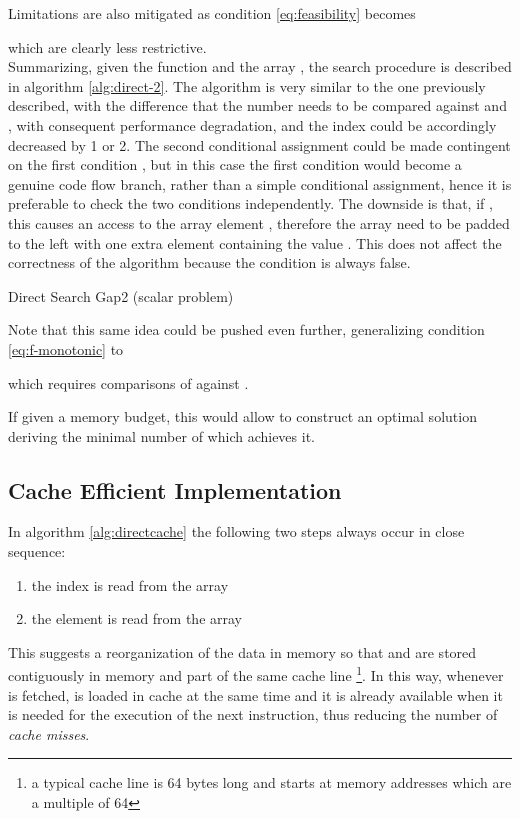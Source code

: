 \documentclass[preprint,1p,times]{elsarticle}
\begin{document}
Limitations are also mitigated as condition \eqref{eq:feasibility} becomes

which are clearly less restrictive. \\

Summarizing, given the function  and the array , the search procedure is described in algorithm \ref{alg:direct-2}. The algorithm is very similar to the one previously described, with the difference that the number  needs to be compared against  and , with consequent performance degradation, and the index  could be accordingly decreased by 1 or 2. The second conditional assignment could be made contingent on the first condition , but in this case the first condition would become a genuine code flow branch, rather than a simple conditional assignment, hence it is preferable to check the two conditions independently. The downside is that, if , this causes an access to the array element , therefore the array  need to be padded to the left with one extra element containing the value . This does not affect the correctness of the algorithm because the condition  is always false.

\begin{algorithm}[ht]
	\caption{Direct Search Gap2 (scalar problem)}
	\label{alg:direct-2}
	\begin{algorithmic}
		\Function {\DirectGapName}{\fin  , , , , \fout }
		\State 
		\State 
		\If {}
		\State  {}
		\EndIf
		\If {}
		\State  {}
		\EndIf
		\EndFunction
	\end{algorithmic}
\end{algorithm}

Note that this same idea could be pushed even further, generalizing condition \eqref{eq:f-monotonic} to

which requires comparisons of  against .

If given a memory budget, this would allow to construct an optimal solution deriving the minimal number of  which achieves it.

\subsection{Cache Efficient Implementation}
In algorithm \ref{alg:directcache} the following two steps always occur in close sequence:
\begin{enumerate}
	\item the index  is read from the array 
	\item the element  is read from the array 
\end{enumerate}
This suggests a reorganization of the data in memory so that  and  are stored contiguously in memory and part of the same cache line \footnote{a typical cache line is 64 bytes long and starts at memory addresses which are a multiple of 64}. In this way, whenever  is fetched,  is loaded in cache at the same time and it is already available when it is needed for the execution of the next instruction, thus reducing the number of \textit{cache misses}.
\end{document}
